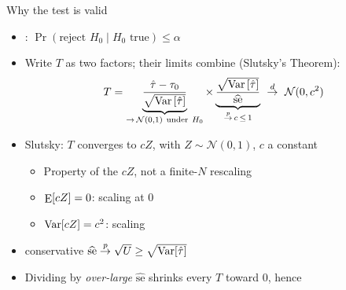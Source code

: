 \documentclass[table, xcolor = {dvipsnames}, 9pt]{beamer}
\theoremstyle{plain}
\newcommand{\mh}[1]{{\color{magenta}{#1}}}
\DeclareMathOperator{\E}{\rm{E}}
\DeclareMathOperator{\Var}{\rm{Var}}
\begin{document}
\begin{frame}{Why the test is valid}
\begin{itemize}
\item \mh{Valid}: $\Pr\left(\text{reject } H_0 \mid H_0 \text{ true}\right) \leq \alpha$ \vfill
\item Write $T$ as two factors; their limits combine (Slutsky's Theorem):
\begin{equation*}
T = \underbrace{\frac{\hat{\tau} - \tau_0}{\sqrt{\Var\left[\hat{\tau}\right]}}}_{\to\, \mathcal{N}(0,1)\ \text{under}\ H_0} \times \underbrace{\frac{\sqrt{\Var\left[\hat{\tau}\right]}}{\widehat{\text{se}}}}_{\overset{p}{\to}\, c\, \leq\, 1} \ \overset{d}{\to}\ \mathcal{N}(0, c^2)
\end{equation*}
\item Slutsky: $T$ converges to $cZ$, with $Z \sim \mathcal{N}(0,1)$, $c$ a constant \vfill
\begin{itemize}
\item Property of the \mh{limiting} $cZ$, not a finite-$N$ rescaling \vfill
\item $\E[cZ] = 0$: scaling \mh{fixes the center} at $0$ \vfill
\item $\Var[cZ] = c^2$: scaling \mh{shrinks the spread} \vfill
\end{itemize}
\item \mh{Why $c \leq 1$?} conservative $\widehat{\text{se}} \overset{p}{\to} \sqrt{U} \geq \sqrt{\Var[\hat{\tau}]}$ \vfill
\item Dividing by \emph{over-large} $\widehat{\text{se}}$ shrinks every $T$ toward $0$, hence \mh{smaller variance}
\end{itemize}
\end{frame}
\end{document}
